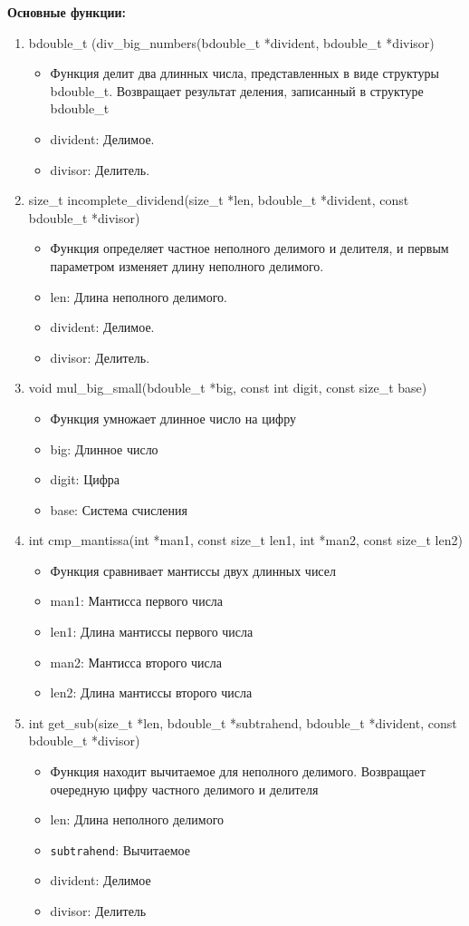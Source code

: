 \textbf{Основные функции:}
\begin{enumerate}
	\item bdouble\_t (div\_big\_numbers(bdouble\_t *divident, bdouble\_t *divisor)
	\begin{itemize}
		\item Функция делит два длинных числа, представленных в виде структуры bdouble\_t. Возвращает результат деления, записанный в структуре bdouble\_t 
		\item divident: Делимое.
		\item divisor: Делитель.
	\end{itemize}
	
	\item size\_t incomplete\_dividend(size\_t *len, bdouble\_t *divident, const bdouble\_t *divisor)
	\begin{itemize}
		\item Функция определяет частное неполного делимого и делителя, и первым параметром изменяет длину неполного делимого.
		\item len: Длина неполного делимого.
		\item divident: Делимое.
		\item divisor: Делитель.
	\end{itemize}
	
	\item void mul\_big\_small(bdouble\_t *big, const int digit, const size\_t base)
	\begin{itemize}
		\item Функция умножает длинное число на цифру
		\item big: Длинное число
		\item digit: Цифра 
		\item base: Система счисления
	\end{itemize}
	
	\item int cmp\_mantissa(int *man1, const size\_t len1, int *man2, const size\_t len2)
	\begin{itemize}
		\item Функция сравнивает мантиссы двух длинных чисел
		\item man1: Мантисса первого числа
		\item len1: Длина мантиссы первого числа
		\item man2: Мантисса второго числа
		\item len2: Длина мантиссы второго числа
	\end{itemize}
	
	\item  int get\_sub(size\_t *len, bdouble\_t *subtrahend, bdouble\_t *divident, const bdouble\_t *divisor)
	\begin{itemize}
		\item Функция находит вычитаемое для неполного делимого. Возвращает очередную цифру частного делимого и делителя
		\item len: Длина неполного делимого
		\item \texttt{subtrahend}: Вычитаемое
		\item divident: Делимое
		\item divisor: Делитель
	\end{itemize}
\end{enumerate}
